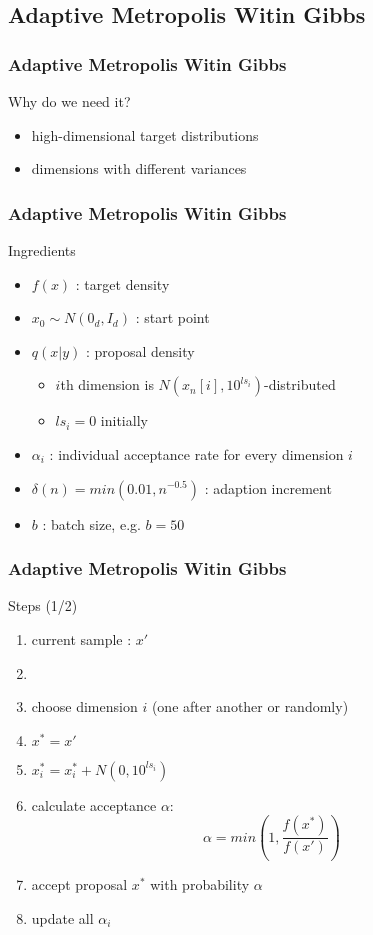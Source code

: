
\subsection{Adaptive Metropolis Witin Gibbs}
\begin{frame}
\frametitle{Adaptive Metropolis Witin Gibbs}
\begin{block}{Why do we need it?}
\begin{itemize}
\item high-dimensional target distributions
\item dimensions with different variances
\end{itemize}
\end{block}

\end{frame}


\begin{frame}
\frametitle{Adaptive Metropolis Witin Gibbs}

\begin{block}{Ingredients}
\begin{itemize}
\item $f(x)$ : target density
\item $x_0 \sim N(0_d, I_d)$ : start point
\item $q(x|y)$ : proposal density
\begin{itemize}
  \item $i$th dimension is $ N(x_n[i], 10^{ls_i})$-distributed
  \item $ls_i = 0$ initially
\end{itemize}
 \item $\alpha_i$ : individual acceptance rate for every dimension $i$
\item $\delta(n) = min(0.01, n^{-0.5})$ : adaption increment
\item $b$ : batch size, e.g. $b=50$
\end{itemize}
\end{block}

\end{frame}




\begin{frame}
\frametitle{Adaptive Metropolis Witin Gibbs}

\begin{block}{Steps (1/2)}
\begin{enumerate}
  \item current sample : $x'$
  \item[]
\item choose dimension $i$ (one after another or randomly)
\item $x^* = x'$
\item $x^*_i = x^*_i + N(0, 10^{ls_i})$
\item calculate acceptance $\alpha$:
\[\alpha = min\left(1, \frac{f(x^*)}{f(x')} \right)\]

\item accept proposal $x^*$ with probability $\alpha$
\item update all $\alpha_i$
\end{enumerate}
\end{block}
\end{frame}

